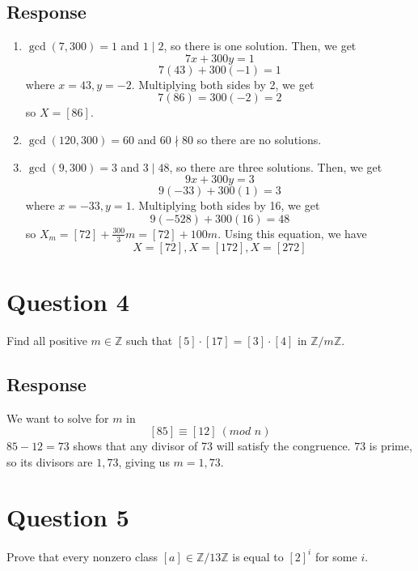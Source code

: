 \documentclass[13pt]{article}
\begin{document}
\subsection*{Response}
\begin{enumerate}[label=(\roman*)]
\item $\gcd(7, 300) = 1$ and $1 \mid 2$, so there is one solution. Then, we get
  \[7x + 300y = 1\]
  \[7(43) + 300(-1) = 1\]
  where $x = 43, y = -2$. Multiplying both sides by 2, we get
  \[7(86) = 300(-2) = 2\]
  so $X = [86]$.

\item $\gcd(120, 300) = 60$ and $60 \nmid 80$ so there are no solutions.

\item $\gcd(9, 300) = 3$ and $3 \mid 48$, so there are three solutions. Then, we get
  \[9x + 300y = 3\]
  \[9(-33) + 300(1) = 3\]
  where $x = -33, y = 1$. Multiplying both sides by 16, we get
  \[9(-528) + 300(16) = 48\]
  so $X_m = [72] + \frac{300}{3}m = [72] + 100m$. Using this equation, we have
  \[X = [72], X = [172], X = [272]\]
\end{enumerate}





\newpage
\section*{Question 4}
Find all positive $m \in \mathbb{Z}$ such that $[5] \cdot [17] = [3] \cdot [4]$ in
$\mathbb{Z}/m\mathbb{Z}$.

\subsection*{Response}
We want to solve for $m$ in
\[[85] \equiv [12] \ (\textit{mod } n)\]
$85 - 12 = 73$ shows that any divisor of 73 will satisfy the congruence. $73$ is prime, so its
divisors are $1, 73$, giving us $m = 1, 73$.





\newpage
\section*{Question 5}
Prove that every nonzero class $[a] \in \mathbb{Z}/13\mathbb{Z}$ is equal to $[2]^i$ for some $i$.
\end{document}

